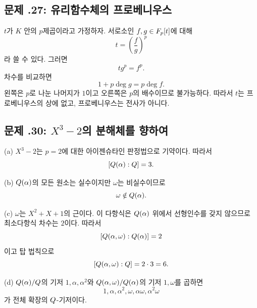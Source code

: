 \subsection*{문제 \thechapter.27: 유리함수체의 프로베니우스}

\begin{solution}
$t$가 $K$ 안의 $p$제곱이라고 가정하자. 서로소인 $f,g\in F_p[t]$에 대해
\[
  t=\left(\frac fg\right)^p
\]
라 쓸 수 있다. 그러면
\[
  t g^p=f^p.
\]
차수를 비교하면
\[
  1+p\deg g=p\deg f.
\]
왼쪽은 $p$로 나눈 나머지가 $1$이고 오른쪽은 $p$의 배수이므로 불가능하다. 따라서 $t$는 프로베니우스의 상에 없고, 프로베니우스는 전사가 아니다.
\end{solution}

\subsection*{문제 \thechapter.30: $X^3-2$의 분해체를 향하여}

\begin{solution}
(a) $X^3-2$는 $p=2$에 대한 아이젠슈타인 판정법으로 기약이다. 따라서
\[
  [Q(\alpha):Q]=3.
\]

(b) $Q(\alpha)$의 모든 원소는 실수이지만 $\omega$는 비실수이므로
\[
  \omega\notin Q(\alpha).
\]

(c) $\omega$는 $X^2+X+1$의 근이다. 이 다항식은 $Q(\alpha)$ 위에서 선형인수를 갖지 않으므로 최소다항식 차수는 $2$이다. 따라서
\[
  [Q(\alpha,\omega):Q(\alpha)]=2
\]
이고 탑 법칙으로
\[
  [Q(\alpha,\omega):Q]=2\cdot3=6.
\]

(d) $Q(\alpha)/Q$의 기저 $1,\alpha,\alpha^2$와 $Q(\alpha,\omega)/Q(\alpha)$의 기저 $1,\omega$를 곱하면
\[
  1,\alpha,\alpha^2,\omega,\alpha\omega,\alpha^2\omega
\]
가 전체 확장의 $Q$-기저이다.
\end{solution}
